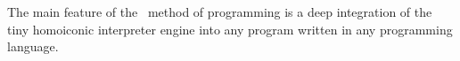 \clearpage
{}\label{ops}

The main feature of the \mel\ method of programming is a deep integration of the
tiny homoiconic interpreter engine into any program written in any programming
language.